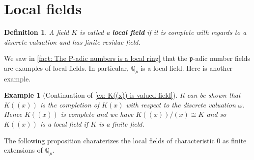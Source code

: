 \documentclass{article}
\newtheorem{definition}{Definition}[section]
\newtheorem{example}{Example}[section]
\newcommand{\mfrak}[1]{\mathfrak{#1}}
\newcommand{\mbb}[1]{\mathbb{#1}}
\numberwithin{equation}{section}
\begin{document}




\section{Local fields}

\begin{definition}\label{def: Local field}
    A field $K$ is called a \textbf{local field} if it is complete with regards to a discrete valuation and has finite residue field.
\end{definition}

We saw in \cref{fact: The P-adic numbers is a local ring} that the $\mfrak p$-adic number fields are examples of local fields. In particular, $\mbb Q_p$ is a local field. Here is another example.
\begin{example}[Continuation of \cref{ex: K((x)) is valued field}]\label{K((x)) is local if K finite}
    It can be shown that $K((x))$ is the completion of $K(x)$ with respect to the discrete valuation $\omega$. Hence $K((x))$ is complete and we have $K((x)) / (x) \cong K$ and so $K((x))$ is a local field if $K$ is a finite field.
\end{example}

The following proposition charaterizes the local fields of characteristic 0 as finite extensions of $\mbb Q_p$.
\end{document}
